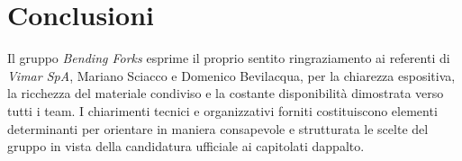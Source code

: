 \documentclass[12pt,a4paper]{article}
\begin{document}
\hypertarget{conclusioni}{%
\section{Conclusioni}}

Il gruppo \emph{Bending Forks} esprime il proprio sentito ringraziamento ai referenti di \emph{Vimar SpA}, Mariano Sciacco e Domenico Bevilacqua, per la chiarezza espositiva, la ricchezza del materiale condiviso e la costante disponibilità dimostrata verso tutti i team. I chiarimenti tecnici e organizzativi forniti costituiscono elementi determinanti per orientare in maniera consapevole e strutturata le scelte del gruppo in vista della candidatura ufficiale ai capitolati d\textquotesingle appalto.
\end{document}
